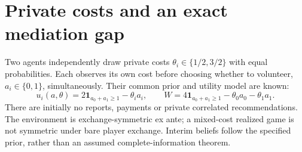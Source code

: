 \section{Private costs and an exact mediation gap}\label{sec:04-bayesian-1}
Two agents independently draw private costs $\theta_i\in\{1/2,3/2\}$ with equal
probabilities. Each observes its own cost before choosing whether to volunteer,
$a_i\in\{0,1\}$, simultaneously. Their common prior and utility model are known:
\[
 u_i(a,\theta)=2\mathbf1_{a_0+a_1\ge1}-\theta_i a_i,\qquad
 W=4\mathbf1_{a_0+a_1\ge1}-\theta_0a_0-\theta_1a_1.
\]
There are initially no reports, payments or private correlated recommendations.
The environment is exchange-symmetric ex ante; a mixed-cost realized game is
not symmetric under bare player exchange. Interim beliefs follow the specified
prior, rather than an assumed complete-information theorem.

